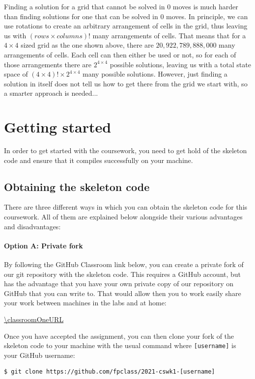 Finding a solution for a grid that cannot be solved in 0 moves is much harder than finding solutions for one that can be solved in 0 moves. In principle, we can use rotations to create an arbitrary arrangement of cells in the grid, thus leaving us with $(\mathit{rows} \times \mathit{columns})!$ many arrangements of cells. That means that for a $4 \times 4$ sized grid as the one shown above, there are $20,922,789,888,000$ many arrangements of cells. Each cell can then either be used or not, so for each of those arrangements there are $2^{4 \times 4}$ possible solutions, leaving us with a total state space of $(4 \times 4)! \times 2^{4 \times 4}$ many possible solutions. However, just finding a solution in itself does not tell us how to get there from the grid we start with, so a smarter approach is needed...


\section{Getting started}
\label{sec:cswk1-getting-started}

In order to get started with the coursework, you need to get hold of the skeleton code and ensure that it compiles successfully on your machine. 

\subsection{Obtaining the skeleton code}

There are three different ways in which you can obtain the skeleton code for this coursework. All of them are explained below alongside their various advantages and disadvantages:

\paragraph{Option A: Private fork} By following the GitHub Classroom link below, you can create a private fork of our git repository with the skeleton code. This requires a GitHub account, but has the advantage that you have your own private copy of our repository on GitHub that you can write to. That would allow then you to work easily share your work between machines in the labs and at home:
\begin{center}
	\url{\classroomOneURL}
\end{center}
Once you have accepted the assignment, you can then clone your fork of the skeleton code to your machine with the usual  command where \texttt{\small [username]} is your GitHub username:
\begin{verbatim}
$ git clone https://github.com/fpclass/2021-cswk1-[username]
\end{verbatim}
